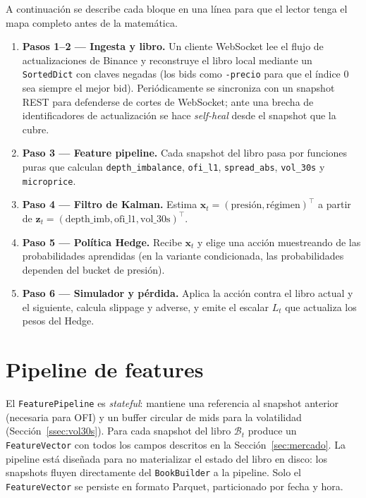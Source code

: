 \documentclass[journal,onecolumn,11pt]{IEEEtran}
\newcommand{\xv}{\mathbf{x}}
\newcommand{\zv}{\mathbf{z}}
\begin{document}
\medskip

A continuación se describe cada bloque en una línea para que el
lector tenga el mapa completo antes de la matemática.

\begin{enumerate}
\item \textbf{Pasos 1--2 --- Ingesta y libro.} Un cliente WebSocket lee
      el flujo de actualizaciones de Binance y reconstruye el libro
      local mediante un \texttt{SortedDict} con claves negadas
      (los bids como \texttt{-precio} para que el índice 0 sea siempre
      el mejor bid). Periódicamente se sincroniza con un snapshot REST
      para defenderse de cortes de WebSocket; ante una brecha de
      identificadores de actualización se hace \emph{self-heal} desde
      el snapshot que la cubre.
\item \textbf{Paso 3 --- Feature pipeline.} Cada snapshot del libro
      pasa por funciones puras que calculan
      \texttt{depth\_imbalance}, \texttt{ofi\_l1},
      \texttt{spread\_abs}, \texttt{vol\_30s} y \texttt{microprice}.
\item \textbf{Paso 4 --- Filtro de Kalman.} Estima
      $\xv_t = (\text{presión}, \text{régimen})^\top$ a partir de
      $\zv_t = (\text{depth\_imb}, \text{ofi\_l1}, \text{vol\_30s})^\top$.
\item \textbf{Paso 5 --- Política Hedge.} Recibe $\xv_t$ y elige una
      acción muestreando de las probabilidades aprendidas (en la
      variante condicionada, las probabilidades dependen del bucket
      de presión).
\item \textbf{Paso 6 --- Simulador y pérdida.} Aplica la acción contra
      el libro actual y el siguiente, calcula slippage y adverse, y
      emite el escalar $L_t$ que actualiza los pesos del Hedge.
\end{enumerate}

\section{Pipeline de features}\label{sec:features}

El \texttt{FeaturePipeline} es \emph{stateful}: mantiene una
referencia al snapshot anterior (necesaria para OFI) y un buffer
circular de mids para la volatilidad (Sección~\ref{ssec:vol30s}).
Para cada snapshot del libro $\mathcal{B}_t$ produce un
\texttt{FeatureVector} con todos los campos descritos en la
Sección~\ref{sec:mercado}. La pipeline está diseñada para no
materializar el estado del libro en disco: los snapshots fluyen
directamente del \texttt{BookBuilder} a la pipeline. Solo el
\texttt{FeatureVector} se persiste en formato Parquet, particionado
por fecha y hora.
\end{document}
